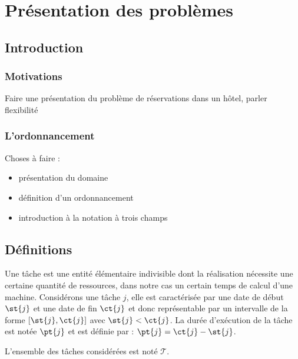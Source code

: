 \documentclass[a4paper,9pt]{report}
\begin{document}
%


\chapter{Pr\'{e}sentation des problèmes}


\section{Introduction}
\subsection{Motivations}

Faire une présentation du problème de réservations dans un hôtel, parler flexibilité

\subsection{L'ordonnancement}

Choses à faire :
\begin{itemize}
    \item présentation du domaine
    \item définition d'un ordonnancement
    \item introduction à la notation à trois champs
\end{itemize}

\section{Définitions}

\begin{ndf}[Tâche]
    Une tâche est une entité élémentaire indivisible dont la réalisation nécessite une certaine
    quantité de ressources, dans notre cas un certain temps de calcul d'une machine. Considérons une
    tâche $j$, elle est caractérisée par une date de début $\st{j}$ et une date de fin $\ct{j}$ et donc
    représentable par un intervalle de la forme $[\st{j}, \ct{j}]$ avec $\st{j} < \ct{j}$. La durée d'exécution
    de la tâche est notée $\pt{j}$ et est définie par : $\pt{j} = \ct{j} - \st{j}$.

    L'ensemble des tâches considérées est noté $\mathcal{T}$.
\end{ndf}
\end{document}
